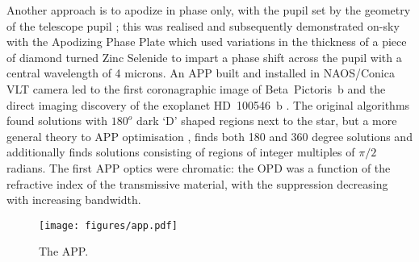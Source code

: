 \documentclass[letterpaper]{ar-1col}
\begin{document}
Another approach is to apodize in phase only, with the pupil set by the geometry of the telescope pupil \citep{Codona04}; this was realised and subsequently demonstrated on-sky with the Apodizing Phase Plate \citep[APP; ][]{Kenworthy07} which used variations in the thickness of a piece of diamond turned Zinc Selenide to impart a phase shift across the pupil with a central wavelength of 4 microns.
%
An APP built and installed in NAOS/Conica VLT camera \citep{Kenworthy10} led to the first coronagraphic image of Beta~Pictoris~b \citep{Quanz10} and the direct imaging discovery of the exoplanet HD~100546~b \citep{Quanz13}.
%
The original algorithms found solutions with $180^o$ dark `D' shaped regions next to the star, but a more general theory to APP optimisation \citep{Por17}, finds both 180 and 360 degree solutions and additionally finds solutions consisting of regions of integer multiples of $\pi/2$ radians.
%
The first APP optics were chromatic: the OPD was a function of the refractive index of the transmissive material, with the suppression decreasing with increasing bandwidth.


\begin{figure}[ht]
  \centering
  \texttt{[image: figures/app.pdf]}
  \caption{The APP.}
  \label{fig:coro_app}
\end{figure}
\end{document}
